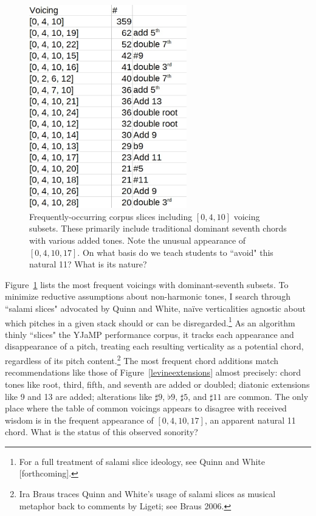 \begin{figure}
	\centering
	\includegraphics[width=2.7in]{0410_tones.jpg}
	\caption{Frequently-occurring corpus slices including $[0,4,10]$ voicing subsets.  These primarily include traditional dominant seventh chords with various added tones.  Note the unusual appearance of $[0,4,10,17]$.  On what basis do we teach students to ``avoid" this natural 11?  What is its nature?}
	\label{[0,4,10]}
\end{figure}

Figure~\ref{[0,4,10]} lists the most frequent voicings with dominant-seventh subsets.  To minimize reductive assumptions about non-harmonic tones, I search through ``salami slices" advocated by Quinn and White, na\"{i}ve verticalities agnostic about which pitches in a given stack should or can be disregarded.\footnote{For a full treatment of salami slice ideology, see Quinn and White [forthcoming].}  As an algorithm thinly ``slices" the YJaMP performance corpus, it tracks each appearance and disappearance of a pitch, treating each resulting verticality as a potential chord, regardless of its pitch content.\footnote{Ira Braus traces Quinn and White's usage of salami slices as musical metaphor back to comments by Ligeti; see Braus 2006.} The most frequent chord additions match recommendations like those of Figure~\ref{levineextensions} almost precisely: chord tones like root, third, fifth, and seventh are added or doubled; diatonic extensions like 9 and 13 are added; alterations like $\sharp 9$, $\flat 9$, $\sharp 5$, and $\sharp 11$ are common.  The only place where the table of common voicings appears to disagree with received wisdom is in the frequent appearance of $[0,4,10,17]$, an apparent natural 11 chord.  What is the status of this observed sonority?

